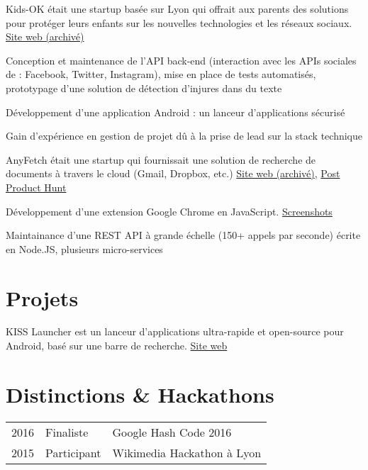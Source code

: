 \documentclass[
  french,
  a4paper
]{resume-openfont}
\begin{document}
\begin{minipage}[t]{0.66\textwidth}
%
%
Kids-OK était une startup basée sur Lyon qui offrait aux parents des solutions pour protéger leurs enfants sur les nouvelles technologies et les réseaux sociaux. \href{https://i.imgur.com/ZAXWuZN.png}{Site web (archivé)}
\vspace{\topsep}
\begin{tightemize}
\item Conception et maintenance de l'API back-end (interaction avec les APIs sociales de : Facebook, Twitter, Instagram), mise en place de tests automatisés, prototypage d'une solution de détection d'injures dans du texte
\item Développement d'une application Android : un lanceur d'applications sécurisé
\item Gain d'expérience en gestion de projet dû à la prise de lead sur la stack technique
\end{tightemize}
\sectionsep

%
%
AnyFetch était une startup qui fournissait une solution de recherche de documents à travers le cloud (Gmail, Dropbox, etc.) \href{https://i.imgur.com/B3MMD6Y.png}{Site web (archivé)}, \href{https://www.producthunt.com/posts/anyfetch}{Post Product Hunt}
\vspace{\topsep}
\begin{tightemize}
\item Développement d'une extension Google Chrome en JavaScript. \href{https://i.imgur.com/yql5v1z.png}{Screenshots}
\item Maintainance d'une REST API à grande échelle (150+ appels par seconde) écrite en Node.JS, plusieurs micro-services
\end{tightemize}


\section{Projets}
%
%
KISS Launcher est un lanceur d'applications ultra-rapide et open-source pour Android, basé sur une barre de recherche. \href{http://kisslauncher.com/}{Site web}
\sectionsep


\section{Distinctions \& Hackathons}
\begin{tabular}{@{}rll}
2016       & Finaliste   & Google Hash Code 2016\\
2015       & Participant & Wikimedia Hackathon à Lyon
\end{tabular}
\sectionsep

\end{minipage}
\end{document}
